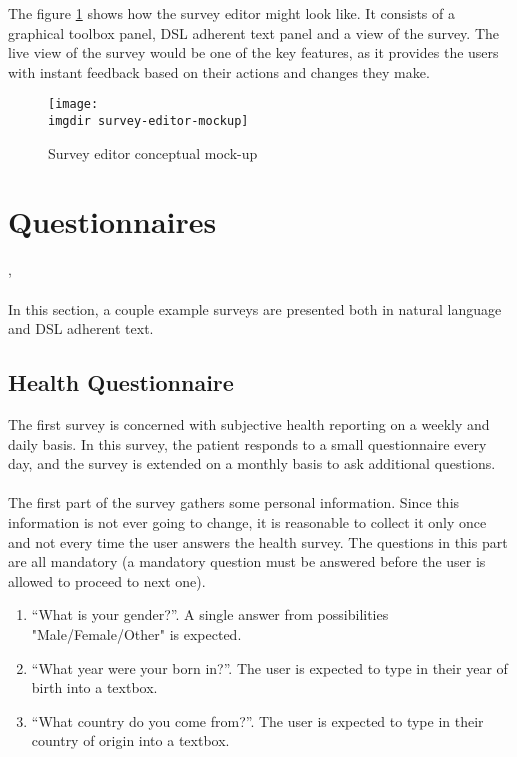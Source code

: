 The figure \ref{fig:survey-editor-mockup} shows how the survey editor might look like. It consists of a graphical toolbox panel, DSL adherent text panel and a view of the survey. The live view of the survey would be one of the key features, as it provides the users with instant feedback based on their actions and changes they make.

\begin{figure}[!ht]
  \centering
  \texttt{[image: \\imgdir survey-editor-mockup]}
  \caption{Survey editor conceptual mock-up}
  \label{fig:survey-editor-mockup}
\end{figure}

\section{Questionnaires}
\label{sec:questionnaires}
\piotr , \pawel \\\\
In this section, a couple example surveys are presented both in natural language and DSL adherent text.

\subsection{Health Questionnaire}
\label{subsec:healthquestionnaire}
The first survey is concerned with subjective health reporting on a weekly and daily basis. In this survey, the patient responds to a small questionnaire every day, and the survey is extended on a monthly basis to ask additional questions.\\\\
The first part of the survey gathers some personal information. Since this information is not ever going to change, it is reasonable to collect it only once and not every time the user answers the health survey. The questions in this part are all mandatory (a mandatory question must be answered before the user is allowed to proceed to next one).

\begin{enumerate}
\item ``What is your gender?''. A single answer from possibilities "Male/Female/Other" is expected.
\item ``What year were your born in?''. The user is expected to type in their year of birth into a textbox.
\item ``What country do you come from?''. The user is expected to type in their country of origin into a textbox.
\end{enumerate}

